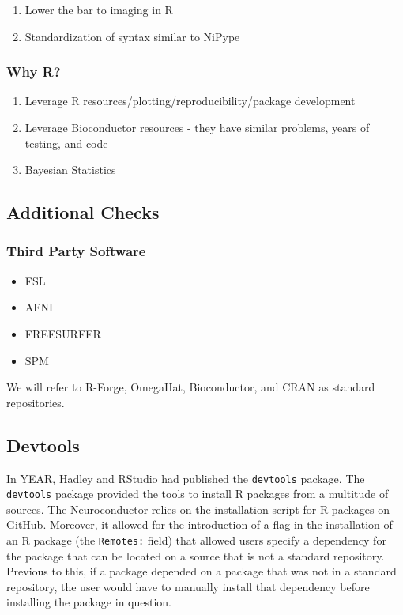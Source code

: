 \documentclass[]{elsarticle} %
\providecommand{\tightlist}{%
  \setlength{\itemsep}{0pt}\setlength{\parskip}{0pt}}
\begin{document}
\begin{enumerate}
\def\labelenumi{\arabic{enumi}.}
\tightlist
\item
  Lower the bar to imaging in R
\item
  Standardization of syntax similar to NiPype
\end{enumerate}

\subsubsection{Why R?}\label{why-r}

\begin{enumerate}
\def\labelenumi{\arabic{enumi}.}
\setcounter{enumi}{2}
\tightlist
\item
  Leverage R resources/plotting/reproducibility/package development
\item
  Leverage Bioconductor resources - they have similar problems, years of
  testing, and code
\item
  Bayesian Statistics
\end{enumerate}

\subsection{Additional Checks}\label{additional-checks}

\subsubsection{Third Party Software}\label{third-party-software}

\begin{itemize}
\tightlist
\item
  FSL
\item
  AFNI
\item
  FREESURFER
\item
  SPM
\end{itemize}

We will refer to R-Forge, OmegaHat, Bioconductor, and CRAN as standard
repositories.

\subsection{Devtools}\label{devtools}

In YEAR, Hadley and RStudio had published the \texttt{devtools} package.
The \texttt{devtools} package provided the tools to install R packages
from a multitude of sources. The Neuroconductor relies on the
installation script for R packages on GitHub. Moreover, it allowed for
the introduction of a flag in the installation of an R package (the
\texttt{Remotes:} field) that allowed users specify a dependency for the
package that can be located on a source that is not a standard
repository. Previous to this, if a package depended on a package that
was not in a standard repository, the user would have to manually
install that dependency before installing the package in question.
\end{document}
